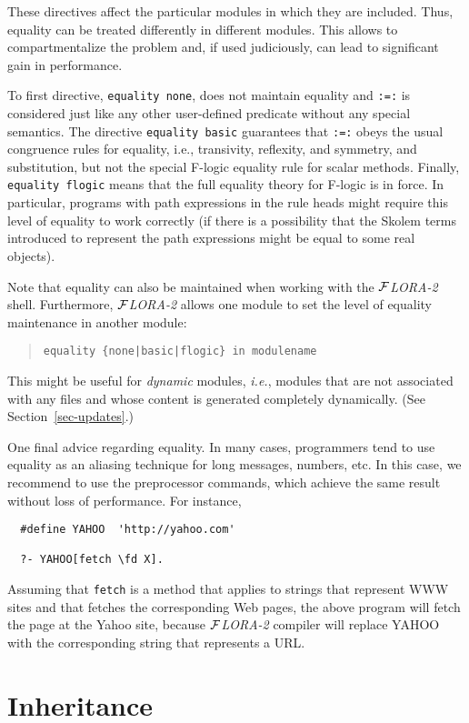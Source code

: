 \documentclass[11pt]{article}
\newcommand{\fd}{\ensuremath{{\rightarrow}}}                   %
\newcommand{\FLORA}{{\mbox{${\cal F}${\small\it LORA}\rm\emph{-2}}}\xspace}
\newcommand{\fl}{\mbox{F-logic}\xspace}
\begin{document}
\noindent
These directives affect the particular modules in which they are included.
Thus, equality can be treated differently in different modules. This allows
to compartmentalize the problem and, if used judiciously, can lead to
significant gain in performance.

To first directive, \mbox{\tt equality none}, does not maintain equality
and {\tt :=:} is considered just like any other user-defined predicate
without any special semantics.  The directive \mbox{\tt equality basic}
guarantees that {\tt :=:} obeys the usual congruence rules for equality,
i.e., transivity, reflexity, and symmetry, and substitution, but not the
special \fl equality rule for scalar methods. Finally, \mbox{\tt equality
  flogic} means that the full equality theory for \fl is in force.  In
particular, programs with path expressions in the rule heads might require
this level of equality to work correctly (if there is a possibility that
the Skolem terms introduced to represent the path expressions might be
equal to some real objects).

Note that equality can also be maintained when working with the \FLORA
shell. Furthermore, \FLORA allows one module to set the level of equality
maintenance in another module:
\begin{quote}
\verb!equality {none|basic|flogic} in modulename!
\end{quote}
This might be useful for \emph{dynamic} modules, {\it i.e.}, modules that
are not associated with any files and whose content is generated completely
dynamically. (See Section~\ref{sec-updates}.)

One final advice regarding equality. In many cases, programmers tend to use
equality as an aliasing technique for long messages, numbers, etc. In this
case, we recommend to use the preprocessor commands, which achieve the same
result without loss of performance. For instance,

\begin{verbatim}
  #define YAHOO  'http://yahoo.com'  

  ?- YAHOO[fetch \fd X].
\end{verbatim}
\noindent
Assuming that {\tt fetch} is a method that applies to strings that
represent WWW sites and that fetches the corresponding Web pages, the above
program will fetch the page at the Yahoo site, because \FLORA compiler will
replace YAHOO with the corresponding string that represents a URL.


\section{Inheritance}\label{sec-inheritance}
\end{document}
